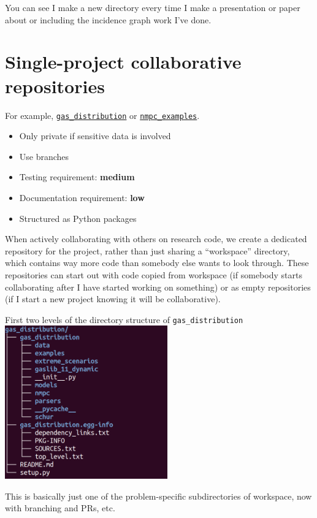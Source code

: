 \documentclass{article}
\begin{document}
You can see I make a new directory every time I make a presentation or
paper about or including the incidence graph work I've done.

\section{Single-project collaborative repositories}
For example,
\href{https://github.com/Robbybp/gas_distribution}{\texttt{gas\_distribution}}
or
\href{https://github.com/robbybp/nmpc_examples}{\texttt{nmpc\_examples}}.
\begin{itemize}
  \item Only private if sensitive data is involved
  \item Use branches
  \item Testing requirement: {\color{purple}\bf medium}
  \item Documentation requirement: {\color{blue}\bf low}
  \item Structured as Python packages
\end{itemize}
When actively collaborating with others on research code, we create
a dedicated repository for the project, rather than just sharing a
``workspace'' directory, which contains way more code than somebody else
wants to look through.
These repositories can start out with code copied from workspace
(if somebody starts collaborating after I have started working on something)
or as empty repositories (if I start a new project knowing it will be
collaborative).

\begin{center}
  First two levels of the directory structure of \texttt{gas\_distribution}
  \includegraphics[width=7cm]{gas_distribution_tree.png}
\end{center}

This is basically just one of the problem-specific subdirectories of
workspace, now with branching and PRs, etc.
\end{document}
